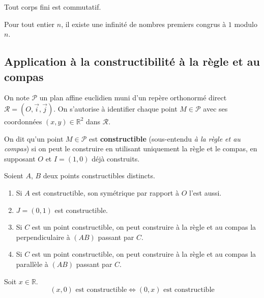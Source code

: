   \begin{application}
    Tout corps fini est commutatif.
  \end{application}


  \begin{application}
    Pour tout entier $n$, il existe une infinité de nombres premiers congrus à $1$ modulo $n$.
  \end{application}

  \subsection{Application à la constructibilité à la règle et au compas}


  On note $\mathcal{P}$ un plan affine euclidien muni d'un repère orthonormé direct $\mathcal{R} = (O, \overrightarrow{i}, \overrightarrow{j})$. On s'autorise à identifier chaque point $M \in \mathcal{P}$ avec ses coordonnées $(x,y) \in \mathbb{R}^2$ dans $\mathcal{R}$.

  \begin{definition}
    On dit qu'un point $M \in \mathcal{P}$ est \textbf{constructible} (sous-entendu \textit{à la règle et au compas}) si on peut le construire en utilisant uniquement la règle et le compas, en supposant $O$ et $I=(1,0)$ déjà construits.
  \end{definition}

  \begin{proposition}
    Soient $A$, $B$ deux points constructibles distincts.
    \begin{enumerate}[label=(\roman*)]
      \item Si $A$ est constructible, son symétrique par rapport à $O$ l'est aussi.
      \item $J = (0,1)$ est constructible.
      \item Si $C$ est un point constructible, on peut construire à la règle et au compas la perpendiculaire à $(AB)$ passant par $C$.
      \item Si $C$ est un point constructible, on peut construire à la règle et au compas la parallèle à $(AB)$ passant par $C$.
    \end{enumerate}
  \end{proposition}

  \begin{proposition}
    Soit $x \in \mathbb{R}$.
    \[ (x,0) \text{ est constructible} \iff (0,x) \text{ est constructible} \]
  \end{proposition}

